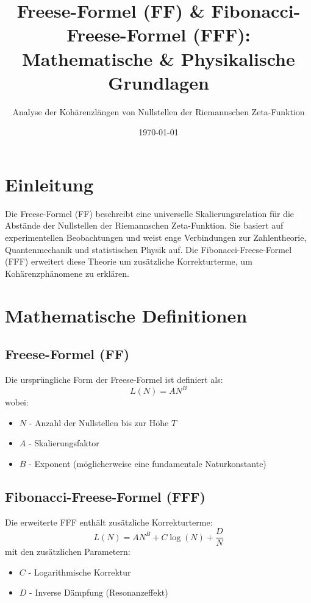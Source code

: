 \documentclass[a4paper,11pt]{article}
\title{Freese-Formel (FF) \& Fibonacci-Freese-Formel (FFF): \\ Mathematische \& Physikalische Grundlagen}
\author{Analyse der Kohärenzlängen von Nullstellen der Riemannschen Zeta-Funktion}
\date{\today}
\begin{document}
\maketitle

\section{Einleitung}
Die Freese-Formel (FF) beschreibt eine universelle Skalierungsrelation für die Abstände der Nullstellen der Riemannschen Zeta-Funktion. Sie basiert auf experimentellen Beobachtungen und weist enge Verbindungen zur Zahlentheorie, Quantenmechanik und statistischen Physik auf. Die Fibonacci-Freese-Formel (FFF) erweitert diese Theorie um zusätzliche Korrekturterme, um Kohärenzphänomene zu erklären.

\section{Mathematische Definitionen}

\subsection{Freese-Formel (FF)}
Die ursprüngliche Form der Freese-Formel ist definiert als:
\begin{equation}
    L(N) = A N^B
\end{equation}
wobei:
\begin{itemize}
    \item $N$ - Anzahl der Nullstellen bis zur Höhe $T$
    \item $A$ - Skalierungsfaktor
    \item $B$ - Exponent (möglicherweise eine fundamentale Naturkonstante)
\end{itemize}

\subsection{Fibonacci-Freese-Formel (FFF)}
Die erweiterte FFF enthält zusätzliche Korrekturterme:
\begin{equation}
    L(N) = A N^B + C \log(N) + \frac{D}{N}
\end{equation}
mit den zusätzlichen Parametern:
\begin{itemize}
    \item $C$ - Logarithmische Korrektur
    \item $D$ - Inverse Dämpfung (Resonanzeffekt)
\end{itemize}
\end{document}
